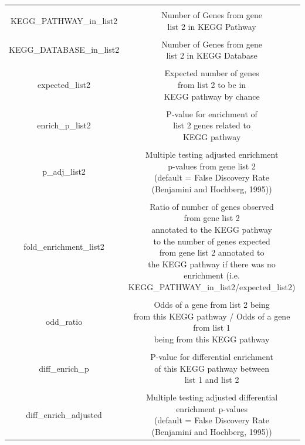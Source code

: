 \documentclass[article]{jss}\usepackage[]{graphicx}\usepackage[]{color}
\begin{document}
\begin{longtable}{cc}
& & \\
KEGG\_PATHWAY\_in\_list2 & \makecell{Number of Genes from gene \\ list 2 in KEGG Pathway} \\
& & \\
KEGG\_DATABASE\_in\_list2 & \makecell{Number of Genes from gene \\ list 2 in KEGG Database} \\
& & \\
expected\_list2 & \makecell{Expected number of genes \\ from list 2 to be in \\ KEGG pathway by chance} \\
& & \\
enrich\_p\_list2 & \makecell{P-value for enrichment of \\ list 2 genes related to \\ KEGG pathway} \\
& & \\
p\_adj\_list2 & \makecell{Multiple testing adjusted enrichment \\ p-values from gene list 2 \\ (default = False Discovery Rate \\ (Benjamini and Hochberg, 1995))} \\
& & \\
fold\_enrichment\_list2 & \makecell{Ratio of number of genes observed \\ from gene list 2 \\ annotated to the KEGG pathway \\ to the number of genes expected \\ from gene list 2 annotated to \\ the KEGG pathway if there was no \\ enrichment (i.e. KEGG\_PATHWAY\_in\_list2/expected\_list2)} \\
& & \\
odd\_ratio & \makecell{Odds of a gene from list 2 being \\ from this KEGG pathway / Odds of a gene from list 1\\  being from this KEGG pathway} \\
& & \\
diff\_enrich\_p & \makecell{P-value for differential enrichment \\ of this KEGG pathway between \\ list 1 and list 2} \\
& & \\
diff\_enrich\_adjusted & \makecell{Multiple testing adjusted differential \\ enrichment p-values \\ (default = False Discovery Rate \\ (Benjamini and Hochberg, 1995))} \\
   \hline
\end{longtable}
\end{document}
